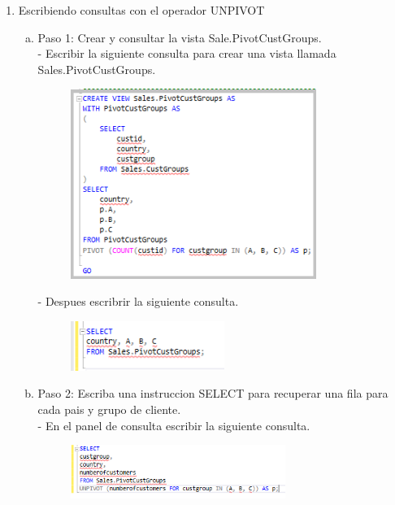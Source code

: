 \begin{enumerate}[1.]
	\item Escribiendo consultas con el operador UNPIVOT
	\begin{enumerate}[a)]
	\item Paso 1: Crear y consultar la vista Sale.PivotCustGroups.\\
		-  Escribir la siguiente consulta para crear una vista llamada Sales.PivotCustGroups.\\
		\begin{figure}[H]
		\begin{center}
		\includegraphics[width=8cm]{./Imagenes/e2-1}
		\end{center}
		\end{figure}
		-  Despues escribrir la siguiente consulta.
		\begin{figure}[H]
		\begin{center}
		\includegraphics[width=5cm]{./Imagenes/c5}
		\end{center}
		\end{figure}
	\item Paso 2: Escriba una instruccion SELECT para recuperar una fila para cada pais y grupo de cliente.\\
		-  En el panel de consulta escribir la siguiente consulta.\\
		\begin{figure}[H]
		\begin{center}
		\includegraphics[width=7cm]{./Imagenes/c6}
		\end{center}
		\end{figure}

\end{enumerate}
\end{enumerate}
